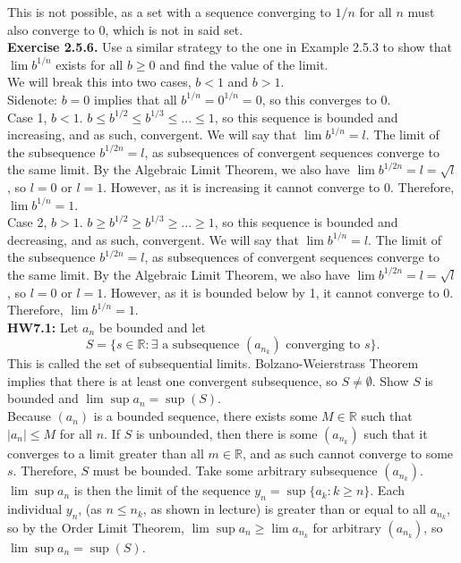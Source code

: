 \documentclass[12pt,letterpaper]{article}
\begin{document}
This is not possible, as a set with a sequence converging to \(1/n\) for all \(n\) must also converge to \(0\), which is not in said set. \\

\textbf{Exercise 2.5.6.} Use a similar strategy to the one in Example 2.5.3 to show that \(\lim b^{1/n}\) exists for all \(b \geq 0\) and find the value of the limit. \\

We will break this into two cases, \(b < 1\) and \(b > 1\). \\

Sidenote: \(b=0\) implies that all \(b^{1/n} = 0^{1/n} = 0\), so this converges to \(0\). \\

Case 1, \(b < 1\). \(b \leq b^{1/2} \leq b^{1/3} \leq ... \leq 1\), so this sequence is bounded and increasing, and as such, convergent. We will say that \(\lim b^{1/n} = l\). The limit of the subsequence \(b^{1/2n} = l\), as subsequences of convergent sequences converge to the same limit. By the Algebraic Limit Theorem, we also have \(\lim b^{1/2n} = l = \sqrt{l}\), so \(l = 0\) or \(l = 1\). However, as it is increasing it cannot converge to 0. Therefore, \(\lim b^{1/n} = 1\). \\

Case 2, \(b > 1\). \(b \geq b^{1/2} \geq b^{1/3} \geq ... \geq 1\), so this sequence is bounded and decreasing, and as such, convergent. We will say that \(\lim b^{1/n} = l\). The limit of the subsequence \(b^{1/2n} = l\), as subsequences of convergent sequences converge to the same limit. By the Algebraic Limit Theorem, we also have \(\lim b^{1/2n} = l = \sqrt{l}\), so \(l = 0\) or \(l = 1\). However, as it is bounded below by 1, it cannot converge to 0. Therefore, \(\lim b^{1/n} = 1\). \\

\textbf{HW7.1:} Let \(a_{n}\) be bounded and let \[S = \{s \in \mathbb{R} : \exists \text{ a subsequence } (a_{n_{k}}) \text{ converging to } s\}.\] This is called the set of subsequential limits. Bolzano-Weierstrass Theorem implies that there is at least one convergent subsequence, so \(S \neq \emptyset\). Show \(S\) is bounded and \(\lim\sup a_{n} = \sup(S)\). \\

Because \((a_{n})\) is a bounded sequence, there exists some \(M \in \mathbb{R}\) such that \(|a_{n}| \leq M\) for all \(n\). If \(S\) is unbounded, then there is some \((a_{n_{k}})\) such that it converges to a limit greater than all \(m \in \mathbb{R}\), and as such cannot converge to some \(s\). Therefore, \(S\) must be bounded. Take some arbitrary subsequence \((a_{n_{k}})\). \(\lim\sup a_{n}\) is then the limit of the sequence \(y_{n} = \sup\{a_{k} : k \geq n\}\). Each individual \(y_{n}\), (as \(n \leq n_{k}\), as shown in lecture) is greater than or equal to all \(a_{n_{k}}\), so by the Order Limit Theorem, \(\lim\sup a_{n} \geq \lim a_{n_{k}}\) for arbitrary \((a_{n_{k}})\), so \(\lim\sup a_{n} = \sup(S)\).
\end{document}
